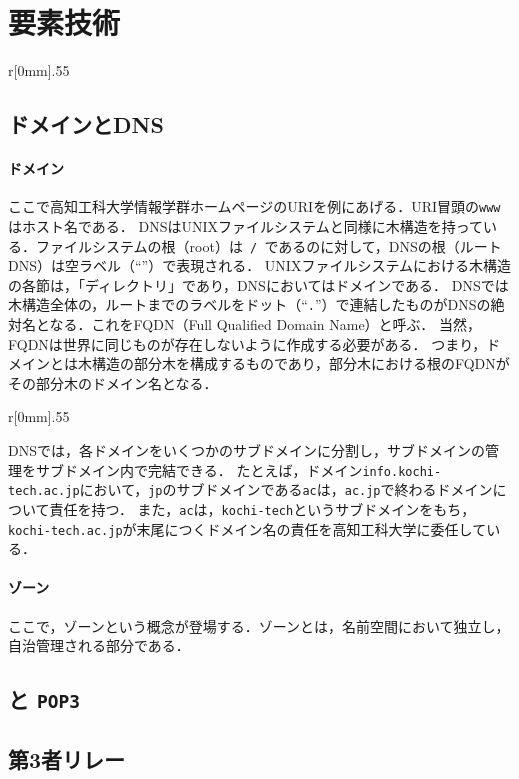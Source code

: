 \section{要素技術}
\newcommand{\popt}{\texttt{POP3}}
\begin{wrapfigure}{r}[0mm]{.55\textwidth}
    \centering
    
\end{wrapfigure}
\subsection{ドメインとDNS}\label{chap:DNS}
\paragraph{ドメイン}
ここで高知工科大学情報学群ホームページのURIを例にあげる．URI冒頭の\texttt{www}はホスト名である．
DNSはUNIXファイルシステムと同様に木構造を持っている．ファイルシステムの根（root）は\texttt{\ /\ }であるのに対して，DNSの根（ルートDNS）は空ラベル（``''）で表現される．
UNIXファイルシステムにおける木構造の各節は，「ディレクトリ」であり，DNSにおいてはドメインである．
DNSでは木構造全体の，ルートまでのラベルをドット（``\texttt{.}''）で連結したものがDNSの絶対名となる．これをFQDN（Full Qualified Domain Name）と呼ぶ．
当然，FQDNは世界に同じものが存在しないように作成する必要がある．
つまり，ドメインとは木構造の部分木を構成するものであり，部分木における根のFQDNがその部分木のドメイン名となる．

\begin{wrapfigure}{r}[0mm]{.55\textwidth}
    \centering
    
\end{wrapfigure}
DNSでは，各ドメインをいくつかのサブドメインに分割し，サブドメインの管理をサブドメイン内で完結できる．
たとえば，ドメイン\texttt{info.kochi-tech.ac.jp}において，\texttt{jp}のサブドメインである\texttt{ac}は，\texttt{ac.jp}で終わるドメインについて責任を持つ．
また，\texttt{ac}は，\texttt{kochi-tech}というサブドメインをもち，\texttt{kochi-tech.ac.jp}が末尾につくドメイン名の責任を高知工科大学に委任している．
\paragraph{ゾーン}ここで，ゾーンという概念が登場する．ゾーンとは，名前空間において独立し，自治管理される部分である．
\subsection{\smtp と \popt}\label{chap:smtppop}
\subsection{第3者リレー}